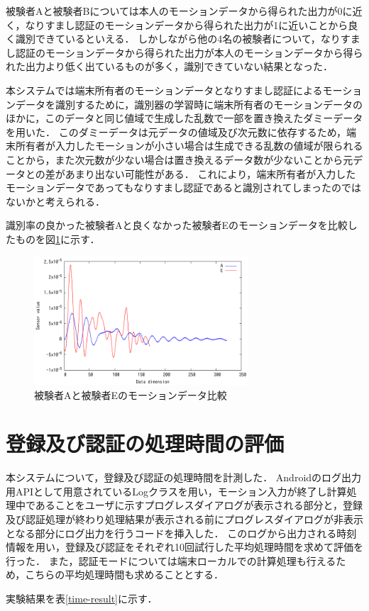 被験者Aと被験者Bについては本人のモーションデータから得られた出力が0に近く，なりすまし認証のモーションデータから得られた出力が1に近いことから良く識別できているといえる．
しかしながら他の4名の被験者について，なりすまし認証のモーションデータから得られた出力が本人のモーションデータから得られた出力より低く出ているものが多く，識別できていない結果となった．

本システムでは端末所有者のモーションデータとなりすまし認証によるモーションデータを識別するために，識別器の学習時に端末所有者のモーションデータのほかに，このデータと同じ値域で生成した乱数で一部を置き換えたダミーデータを用いた．
このダミーデータは元データの値域及び次元数に依存するため，端末所有者が入力したモーションが小さい場合は生成できる乱数の値域が限られることから，また次元数が少ない場合は置き換えるデータ数が少ないことから元データとの差があまり出ない可能性がある．
これにより，端末所有者が入力したモーションデータであってもなりすまし認証であると識別されてしまったのではないかと考えられる．

識別率の良かった被験者Aと良くなかった被験者Eのモーションデータを比較したものを図\ref{compare}に示す．

\begin{figure}[hbtp]
  \centering
  \includegraphics[bb=0 0 360 216, width=8cm]{Graphs/comp.pdf}
  \caption{被験者Aと被験者Eのモーションデータ比較}
  \label{compare}
\end{figure}

\section{登録及び認証の処理時間の評価}
本システムについて，登録及び認証の処理時間を計測した．
Androidのログ出力用APIとして用意されているLogクラス\cite{5-log}を用い，モーション入力が終了し計算処理中であることをユーザに示すプログレスダイアログが表示される部分と，登録及び認証処理が終わり処理結果が表示される前にプログレスダイアログが非表示となる部分にログ出力を行うコードを挿入した．
このログから出力される時刻情報を用い，登録及び認証をそれぞれ10回試行した平均処理時間を求めて評価を行った．
また，認証モードについては端末ローカルでの計算処理も行えるため，こちらの平均処理時間も求めることとする．

実験結果を表\ref{time-result}に示す．
